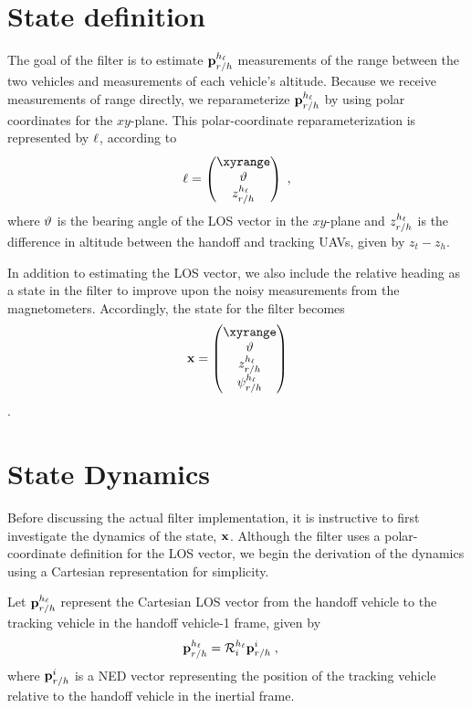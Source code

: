\section{State definition}
The goal of the filter is to estimate ${\mathbf{p}}_{r/h}^{h_\ell}$ measurements of the range between the two vehicles and measurements of each vehicle's altitude.
Because we receive measurements of range directly, we reparameterize ${\mathbf{p}}_{r/h}^{h_\ell}$ by using polar coordinates for the $xy$-plane. 
This polar-coordinate reparameterization is represented by ${\mathbf{\ell}}$, according to
\begin{equation}
    \los = \begin{pmatrix}
    \xyrange \\ \bearing \\ \relzfull
    \end{pmatrix} \;,
\end{equation}
where ${{\vartheta}}$ is the bearing angle of the LOS vector in the $xy$-plane and ${z}_{r/h}^{h_\ell}$ is the difference in altitude between the handoff and tracking UAVs, given by $z_t - z_h$.

In addition to estimating the LOS vector, we also include the relative heading as a state in the filter to improve upon the noisy measurements from the magnetometers.
Accordingly, the state for the filter becomes
\begin{equation} \label{eq:pf_state}
    \x = \begin{pmatrix} \xyrange \\ \bearing \\ \relzfull \\ \relpsifull \end{pmatrix}
\end{equation} \;.

\section{State Dynamics}
Before discussing the actual filter implementation, it is instructive to first investigate the dynamics of the state, ${\mathbf{x}}$.
Although the filter uses a polar-coordinate definition for the LOS vector, we begin the derivation of the dynamics using a Cartesian representation for simplicity.

Let ${\mathbf{p}}_{r/h}^{h_\ell}$ represent the Cartesian LOS vector from the handoff vehicle to the tracking vehicle in the handoff vehicle-1 frame, given by
\begin{align}
    {\mathbf{p}}_{r/h}^{h_\ell} &= {\mathcal{R}}_{i}^{{h_\ell}}{\mathbf{p}}_{r/h}^{i} \;,
\end{align}
where ${\mathbf{p}}_{r/h}^i$ is a NED vector representing the position of the tracking vehicle relative to the handoff vehicle in the inertial frame.

